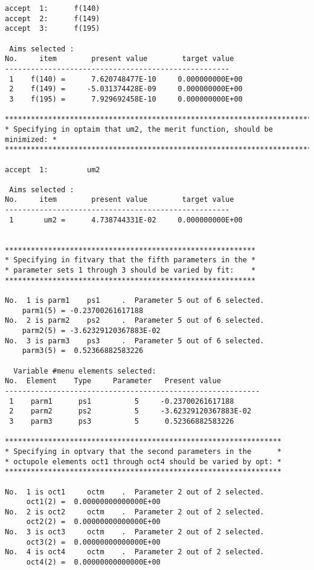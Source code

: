 \begin{footnotesize}
\begin{verbatim}
accept  1:      f(140)
accept  2:      f(149)
accept  3:      f(195)

 Aims selected :
No.     item        present value        target value
----------------------------------------------------
 1    f(140) =      7.620748477E-10     0.000000000E+00
 2    f(149) =     -5.031374428E-09     0.000000000E+00
 3    f(195) =      7.929692458E-10     0.000000000E+00

***************************************************************************
* Specifying in optaim that um2, the merit function, should be minimized: *
***************************************************************************

accept  1:         um2

 Aims selected :
No.     item        present value        target value
----------------------------------------------------
 1       um2 =      4.738744331E-02     0.000000000E+00


**********************************************************
* Specifying in fitvary that the fifth parameters in the *
* parameter sets 1 through 3 should be varied by fit:    *
**********************************************************

No.  1 is parm1    ps1     .  Parameter 5 out of 6 selected.
    parm1(5) = -0.23700261617188
No.  2 is parm2    ps2     .  Parameter 5 out of 6 selected.
    parm2(5) = -3.62329120367883E-02
No.  3 is parm3    ps3     .  Parameter 5 out of 6 selected.
    parm3(5) =  0.52366882583226

  Variable #menu elements selected:
No.  Element    Type     Parameter   Present value
-----------------------------------------------------------
 1    parm1      ps1          5     -0.23700261617188
 2    parm2      ps2          5     -3.62329120367883E-02
 3    parm3      ps3          5      0.52366882583226

****************************************************************
* Specifying in optvary that the second parameters in the      *
* octupole elements oct1 through oct4 should be varied by opt: *
****************************************************************

No.  1 is oct1     octm    .  Parameter 2 out of 2 selected.
     oct1(2) =  0.00000000000000E+00
No.  2 is oct2     octm    .  Parameter 2 out of 2 selected.
     oct2(2) =  0.00000000000000E+00
No.  3 is oct3     octm    .  Parameter 2 out of 2 selected.
     oct3(2) =  0.00000000000000E+00
No.  4 is oct4     octm    .  Parameter 2 out of 2 selected.
     oct4(2) =  0.00000000000000E+00


\end{verbatim}
\end{footnotesize}
